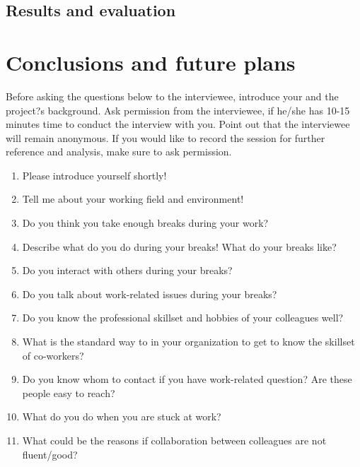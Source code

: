\documentclass[english]{tktltiki}
\begin{document}

\subsection{Results and evaluation}

\section{Conclusions and future plans}

\pagebreak
\nocite{*}




\lastpage
\appendices
\pagestyle{empty}
\singlespacing

Before asking the questions below to the interviewee, introduce your and the project?s background. Ask permission from the interviewee, if he/she has 10-15 minutes time to conduct the interview with you. Point out that the interviewee will remain anonymous. If you would like to record the session for further reference and analysis, make sure to ask permission.

\begin{enumerate}
\item Please introduce yourself shortly!
\item Tell me about your working field and environment! 
\item Do you think you take enough breaks during your work? 
\item Describe what do you do during your breaks! What do your breaks like? 
\item Do you interact with others during your breaks? 
\item Do you talk about work-related issues during your breaks? 
\item Do you know the professional skillset and hobbies of your colleagues well?
\item What is the standard way to in your organization to get to know the skillset of co-workers? 
\item Do you know whom to contact if you have work-related question? Are these people easy to reach? 
\item What do you do when you are stuck at work? 
\item What could be the reasons if collaboration between colleagues are not fluent/good? 
\end{enumerate}
\end{document}
